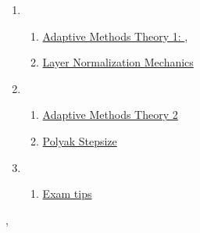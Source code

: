 \documentclass[11pt]{article}
\renewcommand{\today}{\shortmonthname[\the\month] \the \day,  \the\year}
\begin{document}
\begin{enumerate}
\begin{enumerate}
	\end{enumerate}
	\item  %
	\begin{enumerate}
		\item \href{https://mp.weixin.qq.com/s/p0gSUME4UIfh5bFxL1-G0A}{Adaptive Methods Theory 1:  },\quad \href{https://mp.weixin.qq.com/s/DiiHjfSKJEvultKFKHiycQ}{}  %
		\item  \href{https://mp.weixin.qq.com/s/KHP98i56Z5VQcvJdgM2PjA}{Layer Normalization Mechanics} %
	\end{enumerate}
	\item  %
	\begin{enumerate}
		\item \href{https://mp.weixin.qq.com/s/Zij7eMYXTGRoKcHpLv1wjQ}{Adaptive Methods Theory 2} %
		\item  \href{https://mp.weixin.qq.com/s/P0vPBZLS3sCyE1fsJOhz-g}{Polyak Stepsize} %
	\end{enumerate}
	\item  %
	\begin{enumerate}
		\item \href{https://mp.weixin.qq.com/s/KW2hehq8AOZQntKslhIjqw}{Exam tips} %
	\end{enumerate}
\end{enumerate}

%
\begin{flushright}
	\tiny \today 
\end{flushright}
\end{document}
